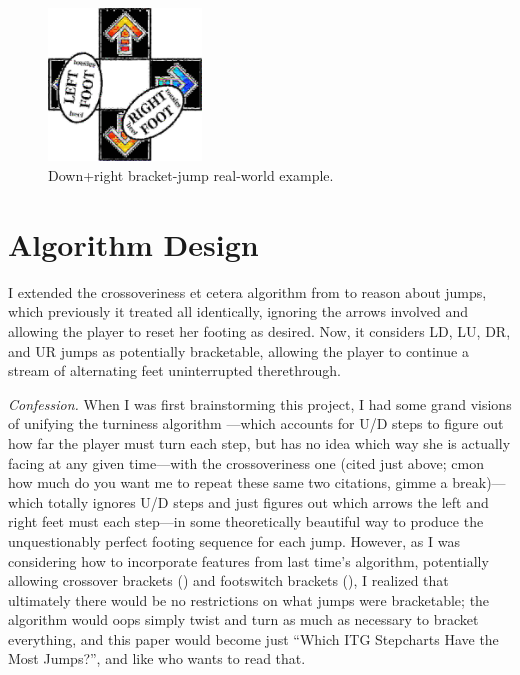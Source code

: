 \documentclass[10pt]{sigplanconf}
\begin{document}
\begin{figure}[h]
	\begin{center}
		\includegraphics[width=0.3625\textwidth]{how-2-bracket.jpg}
	\end{center}
	\caption{Down+right bracket-jump real-world example.}
	\label{fig:how-2-bracket}
\end{figure}


\section{Algorithm Design}
\label{sec:analyzing}

I extended the crossoveriness et cetera algorithm from \cite{crossoveriness} to reason about jumps,
which previously it treated all identically,
ignoring the arrows involved and allowing the player to reset her footing as desired.
Now, it considers LD, LU, DR, and UR jumps as potentially bracketable,
allowing the player to continue a stream of alternating feet uninterrupted therethrough.

\textit{Confession.}
When I was first brainstorming this project,
I had some grand visions of unifying the turniness algorithm \cite{turniness}---which
accounts for U/D steps to figure out how far the player must turn each step,
but has no idea which way she is actually facing at any given time---with
the crossoveriness one
(cited just above; cmon how much do you want me to repeat these same two citations, gimme a break)---which
totally ignores U/D steps and just figures out which arrows the left and right feet must each step---in
some theoretically beautiful way to produce the unquestionably perfect footing sequence for each jump.
%
However, as I was considering how to incorporate features from last time's algorithm,
potentially allowing crossover brackets ()
and footswitch brackets (),
I realized that ultimately there would be no restrictions on what jumps were bracketable;
the algorithm would oops simply twist and turn as much as necessary to bracket everything,
and this paper would become just ``Which ITG Stepcharts Have the Most Jumps?'', and like who wants to read that.
\end{document}
